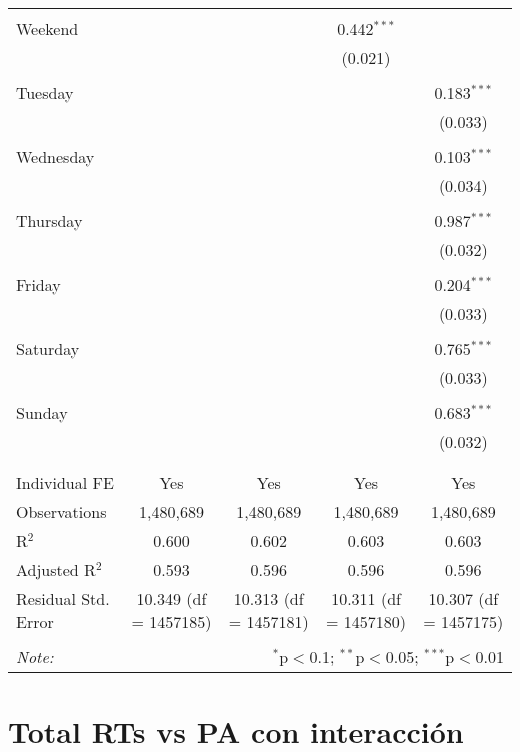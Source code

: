 \documentclass[
]{article}
\begin{document}
\begin{table}[!htbp]
{\begin{tabular}{@{\extracolsep{5pt}}lcccc}
  & & & & \\ 
 Weekend &  &  & 0.442$^{***}$ &  \\ 
  &  &  & (0.021) &  \\ 
  & & & & \\ 
 Tuesday &  &  &  & 0.183$^{***}$ \\ 
  &  &  &  & (0.033) \\ 
  & & & & \\ 
 Wednesday &  &  &  & 0.103$^{***}$ \\ 
  &  &  &  & (0.034) \\ 
  & & & & \\ 
 Thursday &  &  &  & 0.987$^{***}$ \\ 
  &  &  &  & (0.032) \\ 
  & & & & \\ 
 Friday &  &  &  & 0.204$^{***}$ \\ 
  &  &  &  & (0.033) \\ 
  & & & & \\ 
 Saturday &  &  &  & 0.765$^{***}$ \\ 
  &  &  &  & (0.033) \\ 
  & & & & \\ 
 Sunday &  &  &  & 0.683$^{***}$ \\ 
  &  &  &  & (0.032) \\ 
  & & & & \\ 
\hline \\[-1.8ex] 
Individual FE & Yes & Yes & Yes & Yes \\ 
Observations & 1,480,689 & 1,480,689 & 1,480,689 & 1,480,689 \\ 
R$^{2}$ & 0.600 & 0.602 & 0.603 & 0.603 \\ 
Adjusted R$^{2}$ & 0.593 & 0.596 & 0.596 & 0.596 \\ 
Residual Std. Error & 10.349 (df = 1457185) & 10.313 (df = 1457181) & 10.311 (df = 1457180) & 10.307 (df = 1457175) \\ 
\hline 
\hline \\[-1.8ex] 
\textit{Note:}  & \multicolumn{4}{r}{$^{*}$p$<$0.1; $^{**}$p$<$0.05; $^{***}$p$<$0.01} \\ 
\end{tabular}
} 
\end{table} 
\newpage
\section{Total RTs vs PA con interacción}
\end{document}
